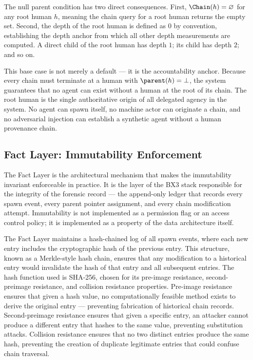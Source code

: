 The null parent condition has two direct consequences. First, $\Chain(h) = \varnothing$ for any root human $h$, meaning the chain query for a root human returns the empty set. Second, the depth of the root human is defined as $0$ by convention, establishing the depth anchor from which all other depth measurements are computed. A direct child of the root human has depth $1$; its child has depth $2$; and so on.

This base case is not merely a default — it is the accountability anchor. Because every chain must terminate at a human with $\parent(h) = \bot$, the system guarantees that no agent can exist without a human at the root of its chain. The root human is the single authoritative origin of all delegated agency in the system. No agent can spawn itself, no machine actor can originate a chain, and no adversarial injection can establish a synthetic agent without a human provenance chain.

\subsection{Fact Layer: Immutability Enforcement}
\label{sec:fact-layer-enforcement}

The Fact Layer is the architectural mechanism that makes the immutability invariant enforceable in practice. It is the layer of the BX3 stack responsible for the integrity of the forensic record — the append-only ledger that records every spawn event, every parent pointer assignment, and every chain modification attempt. Immutability is not implemented as a permission flag or an access control policy; it is implemented as a property of the data architecture itself.

The Fact Layer maintains a hash-chained log of all spawn events, where each new entry includes the cryptographic hash of the previous entry. This structure, known as a Merkle-style hash chain, ensures that any modification to a historical entry would invalidate the hash of that entry and all subsequent entries. The hash function used is SHA-256, chosen for its pre-image resistance, second-preimage resistance, and collision resistance properties. Pre-image resistance ensures that given a hash value, no computationally feasible method exists to derive the original entry — preventing fabrication of historical chain records. Second-preimage resistance ensures that given a specific entry, an attacker cannot produce a different entry that hashes to the same value, preventing substitution attacks. Collision resistance ensures that no two distinct entries produce the same hash, preventing the creation of duplicate legitimate entries that could confuse chain traversal.

